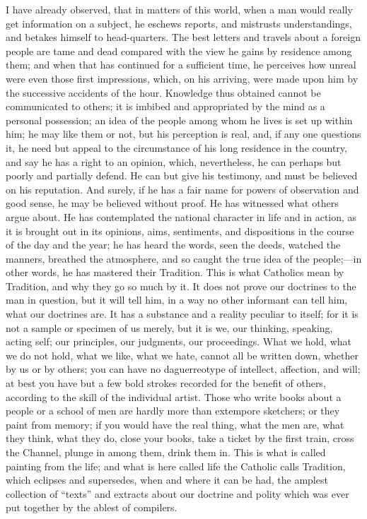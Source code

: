 I have already observed, that in matters of this
world, when a man would really get information on a
subject, he eschews reports, and mistrusts
understandings, and betakes himself to head-quarters. The
best letters and travels about a foreign people are tame
and dead compared with the view he gains by residence
among them; and when that has continued for a sufficient
time, he perceives how unreal were even those first
impressions, which, on his arriving, were made upon him
by the successive accidents of the hour. Knowledge thus
obtained cannot be communicated to others; it is imbibed
and appropriated by the mind as a personal possession; an
idea of the people among whom he lives is set up within
him; he may like them or not, but his perception is real,
and, if any one questions it, he need but appeal to the
circumstance of his long residence in the country, and
say he has a right to an opinion, which, nevertheless, he
can perhaps but poorly and partially defend. He can but
give his testimony, and must be believed on his
reputation. And surely, if he has a fair name for powers
of observation and good sense, he may be believed without
proof. He has witnessed what others argue about. He has
contemplated the national character in life and in
action, as it is brought out in its opinions, aims,
sentiments, and dispositions in the course of the day and
the year; he has heard the words, seen the deeds, watched
the manners, breathed the atmosphere, and so caught the
true idea of the people;—in other words, he has mastered
their Tradition. This is what Catholics mean by
Tradition, and why they go so much by it. It does not
prove our doctrines to the man in question, but it will
tell him, in a way no other informant can tell him, what
our doctrines are. It has a substance and a reality
peculiar to itself; for it is not a sample or specimen of
us merely, but it is we, our thinking, speaking, acting
self; our principles, our judgments, our proceedings.
What we hold, what we do not hold, what we like, what we
hate, cannot all be written down, whether by us or by
others; you can have no daguerreotype of intellect,
affection, and will; at best you have but a few bold
strokes recorded for the benefit of others, according to
the skill of the individual artist. Those who write books
about a people or a school of men are hardly more than
extempore sketchers; or they paint from memory; if you
would have the real thing, what the men are, what they
think, what they do, close your books, take a ticket by
the first train, cross the Channel, plunge in among them,
drink them in. This is what is called painting from the
life; and what is here called life the Catholic calls
Tradition, which eclipses and supersedes, when and where
it can be had, the amplest collection of
``texts'' and extracts about our doctrine and
polity which was ever put together by the ablest of
compilers.

